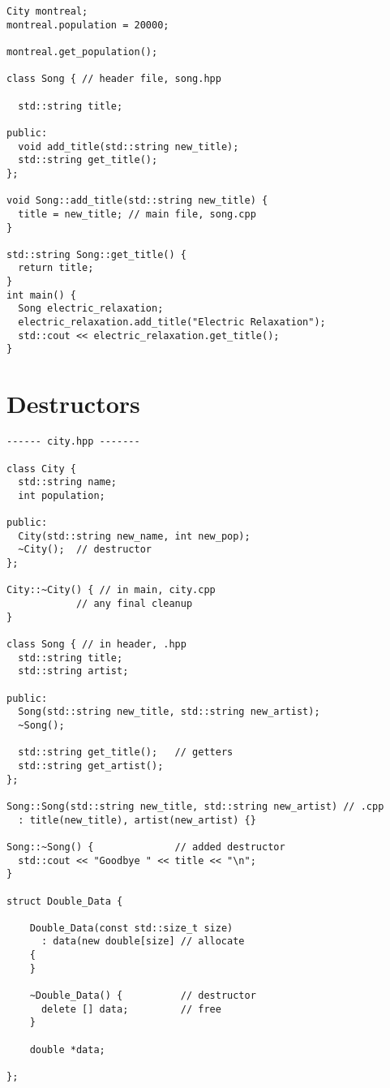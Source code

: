 \begin{verbatim}
City montreal;
montreal.population = 20000;

montreal.get_population();

class Song { // header file, song.hpp

  std::string title;

public:
  void add_title(std::string new_title);
  std::string get_title();
};

void Song::add_title(std::string new_title) {
  title = new_title; // main file, song.cpp
}

std::string Song::get_title() {
  return title;
}
int main() {
  Song electric_relaxation;
  electric_relaxation.add_title("Electric Relaxation");
  std::cout << electric_relaxation.get_title();
}
\end{verbatim}

\section{Destructors}

\begin{verbatim}
------ city.hpp -------

class City { 
  std::string name;
  int population;
 
public:
  City(std::string new_name, int new_pop);
  ~City();  // destructor
};
 
City::~City() { // in main, city.cpp
            // any final cleanup
}

class Song { // in header, .hpp
  std::string title;
  std::string artist;

public:
  Song(std::string new_title, std::string new_artist);
  ~Song();
  
  std::string get_title();   // getters
  std::string get_artist();
};

Song::Song(std::string new_title, std::string new_artist) // .cpp
  : title(new_title), artist(new_artist) {}

Song::~Song() {              // added destructor
  std::cout << "Goodbye " << title << "\n";
}

struct Double_Data {

    Double_Data(const std::size_t size)
      : data(new double[size] // allocate
    {
    }

    ~Double_Data() {          // destructor
      delete [] data;         // free
    }

    double *data;

};
\end{verbatim}


